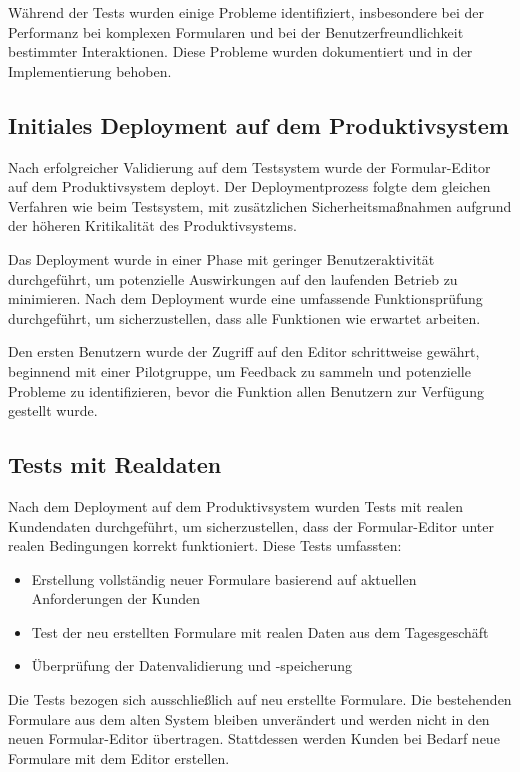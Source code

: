 \documentclass[a4paper,11pt]{article}
\begin{document}
Während der Tests wurden einige Probleme identifiziert, insbesondere bei der Performanz bei komplexen Formularen und bei der Benutzerfreundlichkeit bestimmter Interaktionen. Diese Probleme wurden dokumentiert und in der Implementierung behoben.

\subsection{Initiales Deployment auf dem Produktivsystem}
Nach erfolgreicher Validierung auf dem Testsystem wurde der Formular-Editor auf dem Produktivsystem deployt. Der Deploymentprozess folgte dem gleichen Verfahren wie beim Testsystem, mit zusätzlichen Sicherheitsmaßnahmen aufgrund der höheren Kritikalität des Produktivsystems.

\noindent Das Deployment wurde in einer Phase mit geringer Benutzeraktivität durchgeführt, um potenzielle Auswirkungen auf den laufenden Betrieb zu minimieren. Nach dem Deployment wurde eine umfassende Funktionsprüfung durchgeführt, um sicherzustellen, dass alle Funktionen wie erwartet arbeiten.

\noindent Den ersten Benutzern wurde der Zugriff auf den Editor schrittweise gewährt, beginnend mit einer Pilotgruppe, um Feedback zu sammeln und potenzielle Probleme zu identifizieren, bevor die Funktion allen Benutzern zur Verfügung gestellt wurde.

\subsection{Tests mit Realdaten}
Nach dem Deployment auf dem Produktivsystem wurden Tests mit realen Kundendaten durchgeführt, um sicherzustellen, dass der Formular-Editor unter realen Bedingungen korrekt funktioniert. Diese Tests umfassten:

\begin{itemize}
  \item Erstellung vollständig neuer Formulare basierend auf aktuellen Anforderungen der Kunden
  \item Test der neu erstellten Formulare mit realen Daten aus dem Tagesgeschäft
  \item Überprüfung der Datenvalidierung und -speicherung
\end{itemize}

\noindent Die Tests bezogen sich ausschließlich auf neu erstellte Formulare. Die bestehenden Formulare aus dem alten System bleiben unverändert und werden nicht in den neuen Formular-Editor übertragen. Stattdessen werden Kunden bei Bedarf neue Formulare mit dem Editor erstellen.
\end{document}
